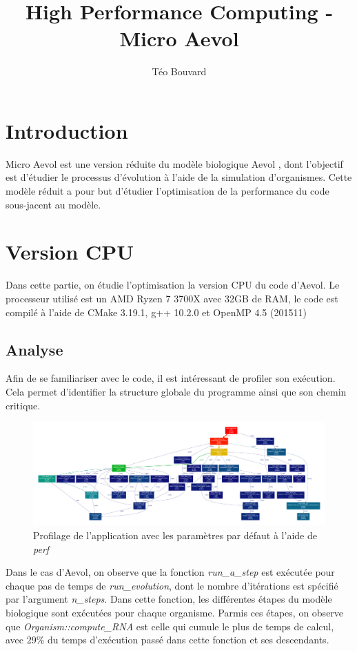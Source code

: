 \documentclass[a4paper, 10pt, twoside]{article}
\begin{document}
\title{High Performance Computing - Micro Aevol}
\author{T\'eo Bouvard}
\maketitle

\section{Introduction}

Micro Aevol est une version réduite du modèle biologique Aevol \cite{aevol}, dont l'objectif est d'étudier le processus d'évolution à l'aide de la simulation d'organismes. Cette modèle réduit a pour but d'étudier l'optimisation de la performance du code sous-jacent au modèle.

\section{Version CPU}

Dans cette partie, on étudie l'optimisation la version CPU du code d'Aevol.
Le processeur utilisé est un AMD Ryzen 7 3700X avec 32GB de RAM, le code est compilé à l'aide de CMake 3.19.1, g++ 10.2.0 et OpenMP 4.5 (201511)

\subsection{Analyse}

Afin de se familiariser avec le code, il est intéressant de profiler son exécution. Cela permet d'identifier la structure globale du programme ainsi que son chemin critique.

\begin{figure}[htpb]
	\includegraphics[width=\linewidth]{img/profile_aevol.pdf}
	\caption{Profilage de l'application avec les paramètres par défaut à l'aide de \textit{perf}}
\end{figure}

Dans le cas d'Aevol, on observe que la fonction \textit{run\_a\_step} est exécutée pour chaque pas de temps de \textit{run\_evolution}, dont le nombre d'itérations est spécifié par l'argument \textit{n\_steps}.
Dans cette fonction, les différentes étapes du modèle biologique sont exécutées pour chaque organisme. Parmis ces étapes, on observe que \textit{Organism::compute\_RNA} est celle qui cumule le plus de temps de calcul, avec 29\% du temps d'exécution passé dans cette fonction et ses descendants.
\end{document}
